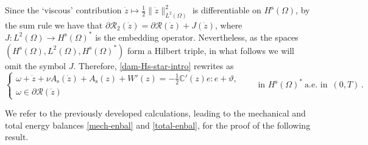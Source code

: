 \documentclass[a4paper,10pt,reqno]{amsart}
\numberwithin{equation}{section}
\numberwithin{equation}{section}
\newcommand{\aein}{\text{a.e.\ in }}
\newcommand{\teta}{\vartheta}
\newcommand{\bbC}{\mathbb{C}}
\newcommand{\Did}[1]{\mathcal{R}(#1)}
\newcommand{\Didv}[1]{\mathcal{R}_{2}(#1)}
\newcommand{\subd}{\partial}
\newcommand{\spz}{H^{\mathrm{s}}(\Omega)}
\newcommand{\As}{A_{\mathrm{s}}}
\newcommand{\EEE}{\color{black}}
\begin{document}
\noindent
Since the `viscous' contribution $\dot{z} \mapsto  \frac12 \| \dot{z}\|_{L^2(\Omega)}^2 $ is differentiable on $\spz$, by the sum rule
 we have that 
$\subd \Didv {\dot z}  = \subd \Did{\dot z} + J(\dot{z})$, where $J : L^2(\Omega) \to \spz^*$ is the embedding operator. Nevertheless, as  the spaces 
$(\spz, L^2(\Omega),\spz^*)$  form a Hilbert triple, in what follows we will omit the symbol $J$. Therefore, \eqref{dam-Hs-star-intro} rewrites as 
  \begin{equation}
\label{no-duality}
\begin{cases}
\omega+\dot{z} + \nu \As(\dot z)+ \As (z) + W'(z) = - \frac12 \bbC'(z) e :e +\teta,
\\
\omega \in \subd \Did {\dot z} 
\end{cases}
 \qquad \text{in }\spz^* \ \aein\, (0,T)\,.
\end{equation}
\par
We 
refer to the previously developed calculations, leading to the mechanical and total energy balances \eqref{mech-enbal} and \eqref{total-enbal}, for the proof of 
the following result. %
\end{document}
